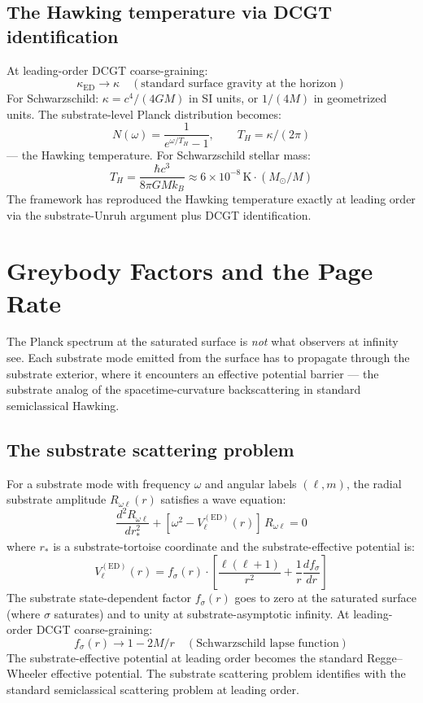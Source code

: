 \documentclass[11pt,a4paper]{article}
\begin{document}
\subsection{The Hawking temperature via DCGT identification}

At leading-order DCGT coarse-graining:
\[
\kappa_{\mathrm{ED}} \to \kappa \quad (\text{standard surface gravity at the horizon})
\]
For Schwarzschild: $\kappa = c^4/(4GM)$ in SI units, or $1/(4M)$ in geometrized units. The substrate-level Planck distribution becomes:
\[
N(\omega) = \frac{1}{e^{\omega/T_H} - 1}, \qquad T_H = \kappa/(2\pi)
\]
--- the Hawking temperature. For Schwarzschild stellar mass:
\[
T_H = \frac{\hbar c^{3}}{8\pi G M k_B} \approx 6 \times 10^{-8}\, \mathrm{K} \cdot (M_\odot/M)
\]
The framework has reproduced the Hawking temperature exactly at leading order via the substrate-Unruh argument plus DCGT identification.

\section{Greybody Factors and the Page Rate}

The Planck spectrum at the saturated surface is \emph{not} what observers at infinity see. Each substrate mode emitted from the surface has to propagate through the substrate exterior, where it encounters an effective potential barrier --- the substrate analog of the spacetime-curvature backscattering in standard semiclassical Hawking.

\subsection{The substrate scattering problem}

For a substrate mode with frequency $\omega$ and angular labels $(\ell, m)$, the radial substrate amplitude $R_{\omega\ell}(r)$ satisfies a wave equation:
\[
\frac{d^{2}R_{\omega\ell}}{dr_*^{2}} + [\omega^{2} - V_\ell^{(\mathrm{ED})}(r)]\, R_{\omega\ell} = 0
\]
where $r_*$ is a substrate-tortoise coordinate and the substrate-effective potential is:
\[
V_\ell^{(\mathrm{ED})}(r) = f_\sigma(r) \cdot \left[\frac{\ell(\ell+1)}{r^{2}} + \frac{1}{r}\frac{df_\sigma}{dr}\right]
\]
The substrate state-dependent factor $f_\sigma(r)$ goes to zero at the saturated surface (where $\sigma$ saturates) and to unity at substrate-asymptotic infinity. At leading-order DCGT coarse-graining:
\[
f_\sigma(r) \to 1 - 2M/r \quad (\text{Schwarzschild lapse function})
\]
The substrate-effective potential at leading order becomes the standard Regge--Wheeler effective potential. The substrate scattering problem identifies with the standard semiclassical scattering problem at leading order.
\end{document}
